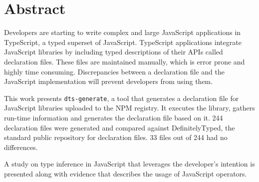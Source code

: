 \chapter*{Abstract}
Developers are starting to write complex and large JavaScript applications in TypeScript, a typed superset of JavaScript. TypeScript applications integrate JavaScript libraries by including typed descriptions of their APIs called declaration files. These files are maintained manually, which is error prone and highly time consuming. Discrepancies between a declaration file and the JavaScript implementation will prevent developers from using them.

This work presents \texttt{dts-generate}, a tool that generates a declaration file for JavaScript libraries uploaded to the NPM registry. It executes the library, gathers run-time information and generates the declaration file based on it. 244 declaration files were generated and compared against DefinitelyTyped, the standard public repository for declaration files. 33 files out of 244 had no differences.

A study on type inference in JavaScript that leverages the developer's intention is presented along with evidence that describes the usage of JavaScript operators.